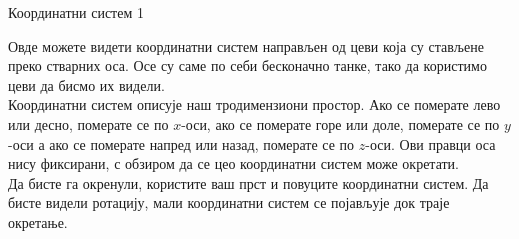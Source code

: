 \documentclass[sr]{./../../common/SurferDesc}%
\begin{document}
\footnotesize
%


\begin{surferPage}
  \begin{surferTitle}Координатни систем 1 \end{surferTitle}
   \begin{surferText}
   
Овде можете видети координатни систем направљен од цеви која су стављене преко стварних оса. Осе су саме по себи бесконачно танке, тако да користимо цеви да бисмо их видели.\\
Координатни систем описује наш тродимензиони простор. Ако се померате лево или десно, померате се по $x$-оси, ако се померате горе или доле, померате се по $y$-оси а ако се померате напред или назад, померате се по $z$-оси. Ови правци оса нису фиксирани, с обзиром да се цео координатни систем може окретати.\\
\vspace{0.3cm}
Да бисте га окренули, користите ваш прст и повуците координатни систем. Да бисте видели ротацију, мали координатни систем се појављује док траје окретање.
     \end{surferText}
\end{surferPage}
\end{document}
